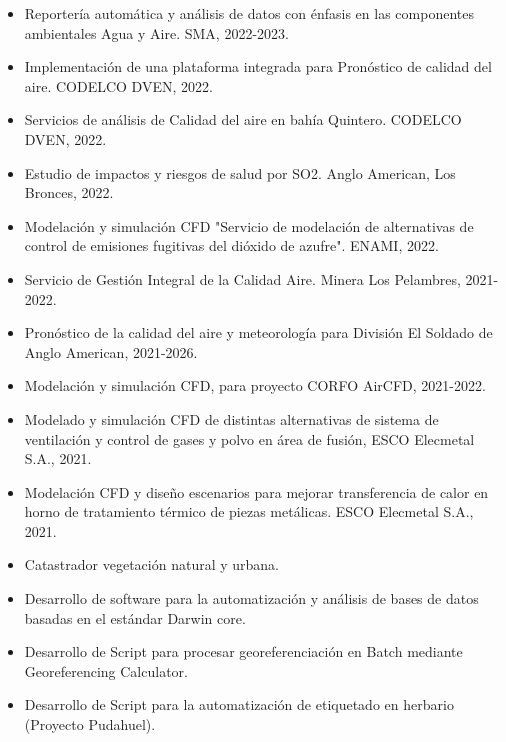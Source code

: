 \documentclass[10pt,letter,ragged2e]{altacv}
\begin{document}
\begin{itemize}
	\item Reportería automática y análisis de datos con énfasis en las componentes ambientales Agua y Aire. SMA, 2022-2023.	
	\item Implementación de una plataforma integrada para Pronóstico de calidad del aire. CODELCO DVEN, 2022.
	\item Servicios de análisis de Calidad del aire en bahía Quintero. CODELCO DVEN, 2022.
	\item Estudio de impactos y riesgos de salud por SO2. Anglo American, Los Bronces, 2022.
	\item Modelación y simulación CFD "Servicio de modelación de alternativas de control de emisiones fugitivas del dióxido de azufre". ENAMI, 2022.
	\item Servicio de Gestión Integral de la Calidad Aire. Minera Los Pelambres, 2021-2022.
  \item Pronóstico de la calidad del aire y meteorología para División El Soldado de Anglo American, 2021-2026.
  \item Modelación y simulación CFD, para proyecto CORFO AirCFD, 2021-2022.
  \item  Modelado y simulación CFD de distintas alternativas de sistema de ventilación y control de gases y polvo en área de fusión, ESCO Elecmetal S.A., 2021.
  \item Modelación CFD y diseño escenarios para mejorar transferencia de calor en horno de tratamiento térmico de piezas metálicas. ESCO Elecmetal S.A., 2021.
\end{itemize}

\divider

\begin{itemize}
\item Catastrador vegetación natural y urbana.
\item{Desarrollo de software para la automatización y análisis de bases de datos basadas en el estándar Darwin core.}
\item{Desarrollo de Script para procesar georeferenciación en Batch mediante Georeferencing Calculator.}
\item Desarrollo de Script para la automatización de etiquetado en herbario (Proyecto Pudahuel).
\end{itemize}
\end{document}
